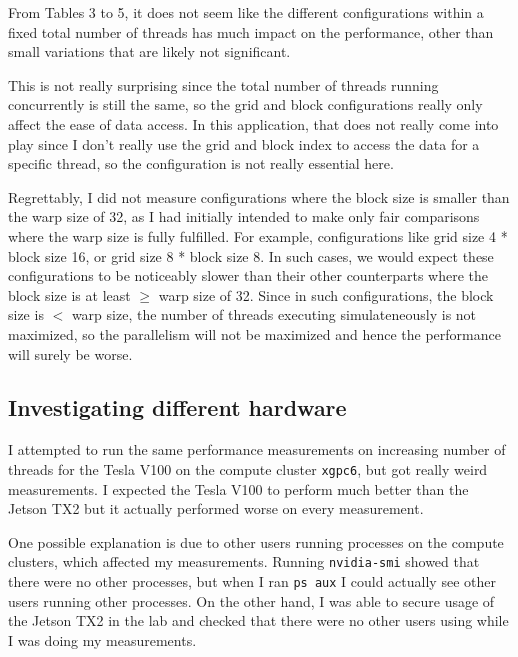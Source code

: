 \documentclass[12pt]{article}
\begin{document}
\bigbreak \noindent From Tables 3 to 5, it does not seem like the different configurations within a fixed total number of threads has much impact on the performance, other than small variations that are likely not significant.

\bigbreak \noindent This is not really surprising since the total number of threads running concurrently is still the same, so the grid and block configurations really only affect the ease of data access. In this application, that does not really come into play since I don't really use the grid and block index to access the data for a specific thread, so the configuration is not really essential here.

\bigbreak \noindent Regrettably, I did not measure configurations where the block size is smaller than the warp size of 32, as I had initially intended to make only fair comparisons where the warp size is fully fulfilled. For example, configurations like grid size 4 * block size 16, or grid size 8 * block size 8. In such cases, we would expect these configurations to be noticeably slower than their other counterparts where the block size is at least $\geq$ warp size of 32. Since in such configurations, the block size is $<$ warp size, the number of threads executing simulateneously is not maximized, so the parallelism will not be maximized and hence the performance will surely be worse.

\subsection{Investigating different hardware}

I attempted to run the same performance measurements on increasing number of threads for the Tesla V100 on the compute cluster \verb!xgpc6!, but got really weird measurements. I expected the Tesla V100 to perform much better than the Jetson TX2 but it actually performed worse on every measurement.

\bigbreak \noindent One possible explanation is due to other users running processes on the compute clusters, which affected my measurements. Running \verb!nvidia-smi! showed that there were no other processes, but when I ran \verb!ps aux! I could actually see other users running other processes. On the other hand, I was able to secure usage of the Jetson TX2 in the lab and checked that there were no other users using while I was doing my measurements.
\end{document}
